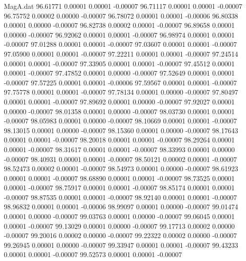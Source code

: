 \begin{filecontents}{MagA.dat}
  96.61771    0.00001    0.00001   -0.00007
  96.71117    0.00001    0.00001   -0.00007
  96.75752    0.00002    0.00000   -0.00007
  96.78072    0.00001    0.00001   -0.00006
  96.80338    0.00001    0.00000   -0.00007
  96.82738    0.00002    0.00001   -0.00007
  96.89658    0.00001    0.00000   -0.00007
  96.92062    0.00001    0.00001   -0.00007
  96.98974    0.00001    0.00001   -0.00007
  97.01288    0.00001    0.00001   -0.00007
  97.03607    0.00001    0.00001   -0.00007
  97.05900    0.00001    0.00001   -0.00007
  97.22211    0.00001    0.00001   -0.00007
  97.24514    0.00001    0.00001   -0.00007
  97.33905    0.00001    0.00001   -0.00007
  97.45512    0.00001    0.00001   -0.00007
  97.47852    0.00001    0.00000   -0.00007
  97.52649    0.00001    0.00001   -0.00007
  97.57225    0.00001    0.00001   -0.00006
  97.59567    0.00001    0.00001   -0.00007
  97.75778    0.00001    0.00001   -0.00007
  97.78134    0.00001    0.00000   -0.00007
  97.80497    0.00001    0.00001   -0.00007
  97.89692    0.00001    0.00000   -0.00007
  97.92027    0.00001    0.00000   -0.00007
  98.01358    0.00001    0.00000   -0.00007
  98.03730    0.00001    0.00001   -0.00007
  98.05983    0.00001    0.00000   -0.00007
  98.10669    0.00001    0.00001   -0.00007
  98.13015    0.00001    0.00000   -0.00007
  98.15360    0.00001    0.00000   -0.00007
  98.17643    0.00001    0.00001   -0.00007
  98.20018    0.00001    0.00001   -0.00007
  98.29264    0.00001    0.00001   -0.00007
  98.31617    0.00001    0.00001   -0.00007
  98.33993    0.00001    0.00000   -0.00007
  98.40931    0.00001    0.00001   -0.00007
  98.50121    0.00002    0.00001   -0.00007
  98.52473    0.00002    0.00001   -0.00007
  98.54973    0.00001    0.00000   -0.00007
  98.61923    0.00001    0.00001   -0.00007
  98.68890    0.00001    0.00001   -0.00007
  98.73525    0.00001    0.00001   -0.00007
  98.75917    0.00001    0.00001   -0.00007
  98.85174    0.00001    0.00001   -0.00007
  98.87535    0.00001    0.00001   -0.00007
  98.92140    0.00001    0.00001   -0.00007
  98.96832    0.00001    0.00001   -0.00006
  98.99097    0.00001    0.00000   -0.00007
  99.01474    0.00001    0.00000   -0.00007
  99.03763    0.00001    0.00000   -0.00007
  99.06045    0.00001    0.00001   -0.00007
  99.13029    0.00001    0.00000   -0.00007
  99.17713    0.00002    0.00000   -0.00007
  99.20016    0.00002    0.00000   -0.00007
  99.22322    0.00002    0.00000   -0.00007
  99.26945    0.00001    0.00000   -0.00007
  99.33947    0.00001    0.00001   -0.00007
  99.43233    0.00001    0.00001   -0.00007
  99.52573    0.00001    0.00001   -0.00007

\end{filecontents}
